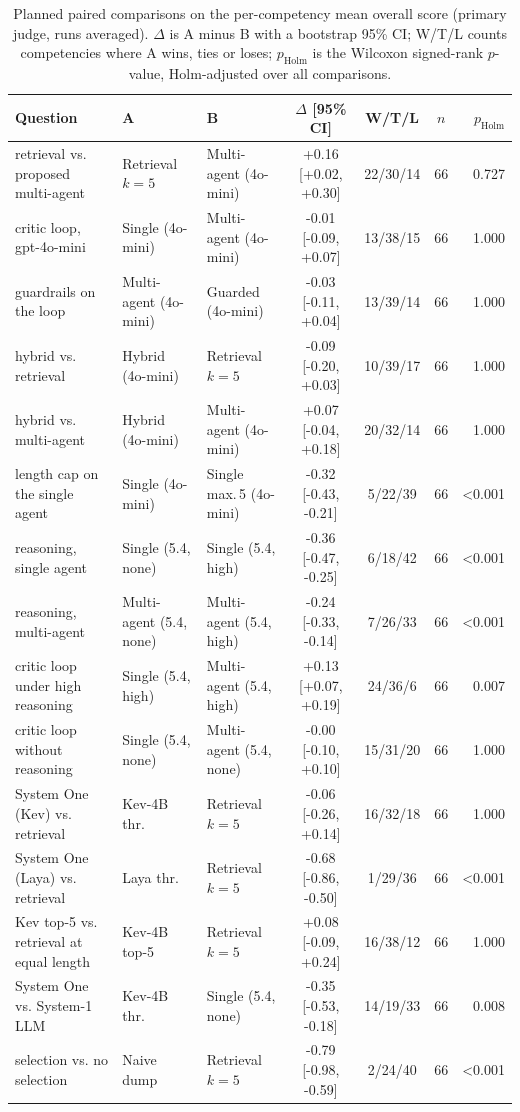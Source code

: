 \begin{table}[t]
\centering
\caption{Planned paired comparisons on the per-competency mean overall score (primary judge, runs averaged). $\Delta$ is A minus B with a bootstrap 95\% CI; W/T/L counts competencies where A wins, ties or loses; $p_{\mathrm{Holm}}$ is the Wilcoxon signed-rank $p$-value, Holm-adjusted over all comparisons.}
\label{tab:pairwise2}
\footnotesize
\begin{tabular}{lllcccr}
\toprule
Question & A & B & $\Delta$ [95\% CI] & W/T/L & $n$ & $p_{\mathrm{Holm}}$ \\
\midrule
retrieval vs. proposed multi-agent & Retrieval $k{=}5$ & Multi-agent (4o-mini) & +0.16 [+0.02, +0.30] & 22/30/14 & 66 & 0.727 \\
critic loop, gpt-4o-mini & Single (4o-mini) & Multi-agent (4o-mini) & -0.01 [-0.09, +0.07] & 13/38/15 & 66 & 1.000 \\
guardrails on the loop & Multi-agent (4o-mini) & Guarded (4o-mini) & -0.03 [-0.11, +0.04] & 13/39/14 & 66 & 1.000 \\
hybrid vs. retrieval & Hybrid (4o-mini) & Retrieval $k{=}5$ & -0.09 [-0.20, +0.03] & 10/39/17 & 66 & 1.000 \\
hybrid vs. multi-agent & Hybrid (4o-mini) & Multi-agent (4o-mini) & +0.07 [-0.04, +0.18] & 20/32/14 & 66 & 1.000 \\
length cap on the single agent & Single (4o-mini) & Single max.\,5 (4o-mini) & -0.32 [-0.43, -0.21] & 5/22/39 & 66 & <0.001 \\
reasoning, single agent & Single (5.4, none) & Single (5.4, high) & -0.36 [-0.47, -0.25] & 6/18/42 & 66 & <0.001 \\
reasoning, multi-agent & Multi-agent (5.4, none) & Multi-agent (5.4, high) & -0.24 [-0.33, -0.14] & 7/26/33 & 66 & <0.001 \\
critic loop under high reasoning & Single (5.4, high) & Multi-agent (5.4, high) & +0.13 [+0.07, +0.19] & 24/36/6 & 66 & 0.007 \\
critic loop without reasoning & Single (5.4, none) & Multi-agent (5.4, none) & -0.00 [-0.10, +0.10] & 15/31/20 & 66 & 1.000 \\
System One (Kev) vs. retrieval & Kev-4B thr. & Retrieval $k{=}5$ & -0.06 [-0.26, +0.14] & 16/32/18 & 66 & 1.000 \\
System One (Laya) vs. retrieval & Laya thr. & Retrieval $k{=}5$ & -0.68 [-0.86, -0.50] & 1/29/36 & 66 & <0.001 \\
Kev top-5 vs. retrieval at equal length & Kev-4B top-5 & Retrieval $k{=}5$ & +0.08 [-0.09, +0.24] & 16/38/12 & 66 & 1.000 \\
System One vs. System-1 LLM & Kev-4B thr. & Single (5.4, none) & -0.35 [-0.53, -0.18] & 14/19/33 & 66 & 0.008 \\
selection vs. no selection & Naive dump & Retrieval $k{=}5$ & -0.79 [-0.98, -0.59] & 2/24/40 & 66 & <0.001 \\
\bottomrule
\end{tabular}
\end{table}
